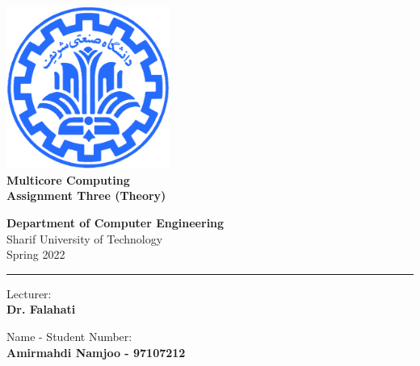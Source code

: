 \documentclass[12pt]{article}
\begin{document}
	
	
\begin{titlepage}
	\begin{center}
		
		\vspace*{0.7cm}
		
		\includegraphics[width=0.4\textwidth]{sharif1.png}\\
		\vspace{0.5cm}
		\textbf{ \Huge{Multicore Computing} }\\
		\vspace{0.5cm}
		\textbf{ \Large{ Assignment Three (Theory)} }
		\vspace{0.2cm}
		
		
		\large \textbf{Department of Computer Engineering}\\\vspace{0.2cm}
		\large   Sharif University of Technology\\\vspace{0.2cm}
		\large   Spring 2022 \\\vspace{0.2cm}
		\noindent\rule[1ex]{\linewidth}{1pt}
		Lecturer:\\
		\textbf{{Dr. Falahati}}
		
		
		\vspace{0.15cm}
		Name - Student Number:\\
		
		
		\textbf{{Amirmahdi Namjoo - 97107212}}
	\end{center}
\end{titlepage}


\newpage
\pagestyle{fancy}
\fancyhf{}
\fancyfoot{}
\cfoot{\thepage}
\end{document}

